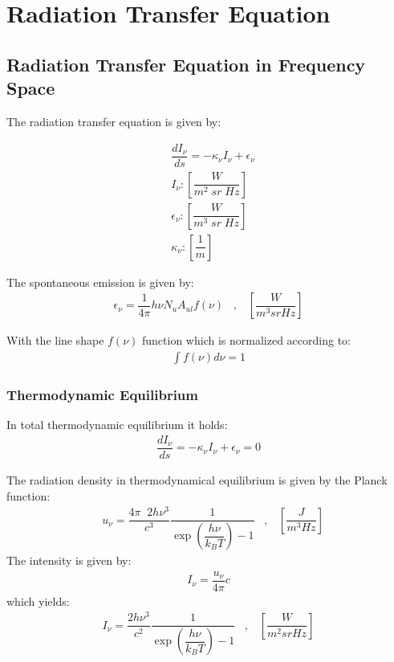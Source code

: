 \section{Radiation Transfer Equation}

\subsection{Radiation Transfer Equation in Frequency Space}

The radiation transfer equation is given by:

\begin{align}
&\dfrac{d I_{\nu}}{ds} = - \kappa_{\nu} I_{\nu} + \epsilon_{\nu} \\
&I_{\nu}        : \left[\dfrac{W}{m^2 \; sr \; Hz}\right] \\
&\epsilon_{\nu} : \left[\dfrac{W}{m^3 \; sr \; Hz}\right] \\
&\kappa_{\nu}   : \left[\dfrac{1}{m}\right]
\end{align}

The spontaneous emission is given by: 
\begin{align}
\epsilon_{\nu} = \dfrac{1}{4 \pi} h \nu N_u A_{ul} f(\nu) \;\;\; , \;\;\; \left[\dfrac{W}{m^3 sr Hz}\right]
\end{align}

With the line shape $f(\nu)$ function which is normalized according to:
\begin{align}
\int f(\nu) d\nu = 1
\end{align}

\subsubsection{Thermodynamic Equilibrium}

In total thermodynamic equilibrium it holds:
\begin{align}
\dfrac{d I_{\nu}}{ds} = - \kappa_{\nu} I_{\nu} + \epsilon_{\nu} = 0
\end{align}

The radiation density in thermodynamical equilibrium is given by the Planck function:
\begin{align}
	&u_{\nu} = \dfrac{4 \pi \;\; 2 h \nu^3}{c^3}  \dfrac{1}{\exp\left(\dfrac{h \nu}{k_B T}\right) - 1} \;\;\; , \;\;\; \left[\dfrac{J}{m^3 Hz}\right]
\end{align}
The intensity is given by:
\begin{align}
	I_{\nu} = \dfrac{u_{\nu}}{4 \pi} c
\end{align}
which yields:
\begin{align}
	I_{\nu} = \dfrac{2 h \nu^3}{c^2}  \dfrac{1}{\exp\left(\dfrac{h\nu}{k_B T}\right) - 1} \;\;\; , \;\;\; \left[\dfrac{W}{m^2 sr Hz}\right]
\end{align}

